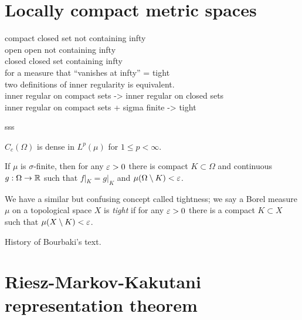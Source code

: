 \documentclass{../../large}
\begin{document}
\section{Locally compact metric spaces}


compact  closed set not containing infty\\
open     open not containing infty\\
closed   closed set containing infty\\

for a measure that ``vanishes at infty'' = tight\\
two definitions of inner regularity is equivalent.\\

inner regular on compact sets -> inner regular on closed sets\\
inner regular on compact sets + sigma finite -> tight\\

\begin{prb}
\end{prb}

\begin{prb}
sss
\begin{parts}
\item $C_c(\Omega)$ is dense in $L^p(\mu)$ for $1\le p<\infty$.
\item If $\mu$ is $\sigma$-finite, then for any $\varepsilon>0$ there is compact $K\subset\Omega$ and continuous $g:\Omega\to\mathbb{R}$ such that $f|_K=g|_K$ and $\mu(\Omega\setminus K)<\varepsilon$.
\end{parts}
\end{prb}


\begin{prb}
We have a similar but confusing concept called tightness; we say a Borel measure $\mu$ on a topological space $X$ is \emph{tight} if for any $\varepsilon>0$ there is a compact $K\subset X$ such that $\mu(X\setminus K)<\varepsilon$.

History of Bourbaki's text.
\begin{parts}
\item
\end{parts}
\end{prb}





\section{Riesz-Markov-Kakutani representation theorem}
\end{document}
